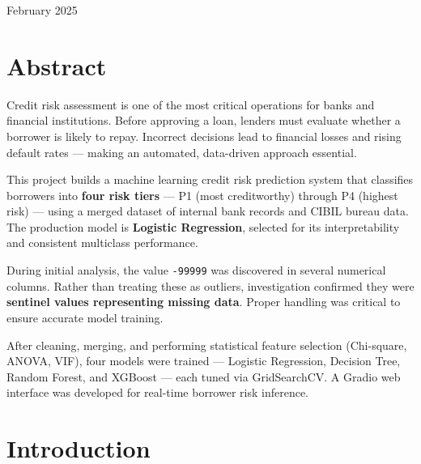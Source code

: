 \documentclass[12pt,a4paper]{article}
\begin{document}
\vfill
\begin{center}{\color{linegray}\small February 2025}\end{center}

\newpage
{\setlength{\parskip}{0pt}\tableofcontents}
\newpage

\section{Abstract}

Credit risk assessment is one of the most critical operations for banks and
financial institutions. Before approving a loan, lenders must evaluate whether
a borrower is likely to repay. Incorrect decisions lead to financial losses and
rising default rates --- making an automated, data-driven approach essential.

\begin{keybox}
  This project builds a machine learning credit risk prediction system that
  classifies borrowers into \textbf{four risk tiers} --- P1 (most creditworthy)
  through P4 (highest risk) --- using a merged dataset of internal bank records
  and CIBIL bureau data. The production model is \textbf{Logistic Regression},
  selected for its interpretability and consistent multiclass performance.
\end{keybox}

During initial analysis, the value \texttt{-99999} was discovered in several
numerical columns. Rather than treating these as outliers, investigation confirmed
they were \textbf{sentinel values representing missing data}. Proper handling was
critical to ensure accurate model training.

After cleaning, merging, and performing statistical feature selection
(Chi-square, ANOVA, VIF), four models were trained --- Logistic Regression,
Decision Tree, Random Forest, and XGBoost --- each tuned via GridSearchCV.
A Gradio web interface was developed for real-time borrower risk inference.

\newpage

\section{Introduction}
\end{document}
